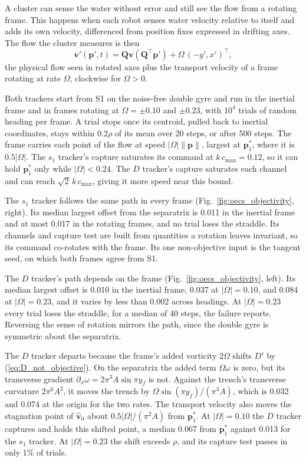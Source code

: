 \documentclass[lettersize,journal]{IEEEtran}
\begin{document}
A cluster can sense the water without error and still see the flow from a
rotating frame. This happens when each robot senses water velocity relative
to itself and adds its own velocity, differenced from position fixes
expressed in drifting axes. The flow the cluster measures is then
\[
\mathbf{v}'(\mathbf{p}', t) =
\mathbf{Q}\mathbf{v}(\mathbf{Q}^\top \mathbf{p}') + \Omega\,(-y', x')^\top ,
\]
the physical flow seen in rotated axes plus the transport velocity of a
frame rotating at rate $\Omega$, clockwise for $\Omega > 0$.

Both trackers start from S1 on the noise-free double gyre and run in the
inertial frame and in frames rotating at $\Omega = \pm 0.10$ and
$\pm 0.23$, with $10^4$ trials of random heading per frame. A trial stops
once its centroid, pulled back to inertial coordinates, stays within
$0.2\rho$ of its mean over 20 steps, or after 500 steps. The frame carries each point of the flow at speed
$|\Omega|\lVert\mathbf{p}\rVert$, largest at $\mathbf{p}^*_1$, where it
is $0.5|\Omega|$. The $s_1$ tracker's capture saturates its command at
$k\,c_{\max} = 0.12$, so it can hold $\mathbf{p}^*_1$ only while
$|\Omega| < 0.24$. The $D$ tracker's capture saturates each channel and
can reach $\sqrt{2}\,k\,c_{\max}$, giving it more speed near this bound.

The $s_1$ tracker follows the same path in every frame
(Fig.~\ref{fig:oecs_objectivity}, right). Its median largest offset from
the separatrix is 0.011 in the inertial frame and at most
0.017 in the rotating frames, and no trial loses the straddle. Its
channels and capture test are built from quantities a rotation leaves
invariant, so its command co-rotates with the frame. Its one
non-objective input is the tangent seed, on which both frames agree from
S1.

The $D$ tracker's path depends on the frame
(Fig.~\ref{fig:oecs_objectivity}, left). Its median largest offset is
0.010 in the inertial frame, 0.037 at $|\Omega| = 0.10$, and
0.084 at $|\Omega| = 0.23$, and it varies by less than 0.002
across headings. At $|\Omega| = 0.23$ every trial loses the straddle, for
a median of 40 steps, the failure \cite{26} reports. Reversing the
sense of rotation mirrors the path, since the double gyre is symmetric
about the separatrix.

The $D$ tracker departs because the frame's added vorticity $2\Omega$
shifts $D'$ by (\ref{eq:D_not_objective}). On the separatrix the added
term $\Omega\omega$ is zero, but its transverse gradient
$\partial_x\omega = 2\pi^3 A\sin\pi y_f$ is not. Against the trench's
transverse curvature $2\pi^6 A^2$, it moves the trench by
$\Omega\sin(\pi y_f)/(\pi^3 A)$, which is 0.032 and 0.074 at the
origin for the two rates. The transport velocity also moves the
stagnation point of $\hat{\mathbf{v}}_0$ about $0.5|\Omega|/(\pi^2 A)$
from $\mathbf{p}^*_1$. At $|\Omega| = 0.10$ the $D$ tracker captures and
holds this shifted point, a median 0.067 from $\mathbf{p}^*_1$
against 0.013 for the $s_1$ tracker. At $|\Omega| = 0.23$ the
shift exceeds $\rho$, and its capture test passes in only 1\% of
trials.
\end{document}
